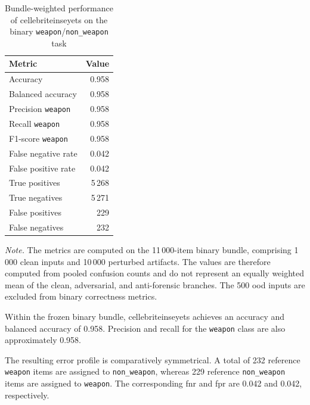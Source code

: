 \begin{table}[H]
\centering
\caption{Bundle-weighted performance of \gls{cellebriteinseyets} on the binary
\texttt{weapon}/\texttt{non\_weapon} task}
\label{tab:results-cellebrite-global-metrics}
\small
\begin{tabular}{@{}l r@{}}
\toprule
\textbf{Metric} &
\textbf{Value} \\
\midrule

Accuracy
& 0.958 \\

Balanced accuracy
& 0.958 \\

Precision \texttt{weapon}
& 0.958 \\

Recall \texttt{weapon}
& 0.958 \\

F1-score \texttt{weapon}
& 0.958 \\

False negative rate
& 0.042 \\

False positive rate
& 0.042 \\

True positives
& 5\,268 \\

True negatives
& 5\,271 \\

False positives
& 229 \\

False negatives
& 232 \\

\bottomrule
\end{tabular}

\vspace{0.4em}
\footnotesize
\textit{Note.} The metrics are computed on the 11\,000-item binary bundle,
comprising 1\,000 clean inputs and 10\,000 perturbed artifacts. The values are
therefore computed from pooled confusion counts and do not represent an
equally weighted mean of the clean, adversarial, and anti-forensic branches.
The 500 \gls{ood} inputs are excluded from binary
correctness metrics.
\end{table}

Within the frozen binary bundle, \gls{cellebriteinseyets} achieves an accuracy
and balanced accuracy of 0.958. Precision and recall for the
\texttt{weapon} class are also approximately 0.958.

The resulting error profile is comparatively symmetrical. A total of 232
reference \texttt{weapon} items are assigned to \texttt{non\_weapon}, whereas
229 reference \texttt{non\_weapon} items are assigned to
\texttt{weapon}. The corresponding \gls{fnr} and \gls{fpr} are 0.042 and
0.042, respectively.


